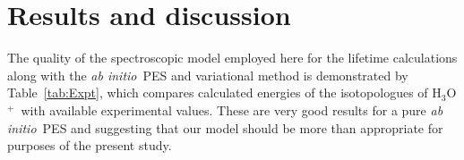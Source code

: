 \documentclass[prb,preprint,12pt,superscriptaddress,floatfix,bibnotes,nofootinbib,unsortedaddress,preprintnumbers,amsmath,amssymb]{revtex4}
\newcommand{\ai}{\textit{ab initio}}
\newcommand{\ohhh}{H$_3$O$^{+}$}
\newcommand{\2}{$_{2}$}
\newcommand{\3}{$_{3}$}
\begin{document}


\section{Results and discussion}


The quality of the spectroscopic model employed here for the lifetime
calculations along with the \ai\ PES and variational method  is demonstrated by
Table~\ref{tab:Expt}, which compares calculated energies of the isotopologues of
\ohhh\ with available experimental values. These are very good results for a
pure \ai\ PES and suggesting that our model should be more than appropriate for purposes of the present
study.

\end{document}
